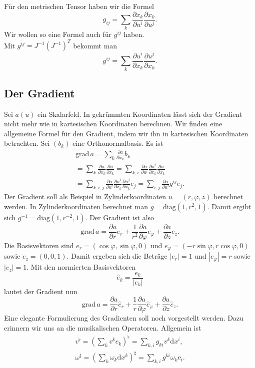 \documentclass[a4paper,10pt,fleqn,twocolumn,twoside]{article}
\begin{document}
Für den metrischen Tensor haben wir die Formel
\[g_{ij} = \sum_{k} \frac{\partial x_k}{\partial u^i}
\frac{\partial x_k}{\partial u^j}.\]
Wir wollen so eine Formel auch für \(g^{ij}\) haben.\\
Mit \(g^{ij}=J^{-1}(J^{-1})^T\) bekommt man
\[g^{ij} = \sum_{k} \frac{\partial u^i}{\partial x_k}
\frac{\partial u^j}{\partial x_k}.\]

\subsection{Der Gradient}

Sei \(a(u)\) ein Skalarfeld. In gekrümmten Koordinaten lässt sich
der Gradient nicht mehr wie in kartesischen Koordinaten berechnen.
Wir finden eine allgemeine Formel für den Gradient, indem wir ihn in
kartesischen Koordinaten betrachten. Sei \((b_k)\) eine
Orthonormalbasis. Es ist
\begin{gather*}\mathrm{grad}\,a
= \sum_{k}\frac{\partial a}{\partial x_k}b_k\\
= \sum_{k}\frac{\partial a}{\partial x_k}\frac{\partial u}{\partial x_k}
= \sum_{k,i}\frac{\partial a}{\partial u^i}\frac{\partial u^i}{\partial x_k}
\frac{\partial u}{\partial x_k}\\
= \sum_{k,i,j}\frac{\partial a}{\partial u^i}\frac{\partial u^i}{\partial x_k}
\frac{\partial u^j}{\partial x_k}e_j
= \sum_{i,j}\frac{\partial a}{\partial u^i} g^{ij}e_j.
\end{gather*}
%
Der Gradient soll als Beispiel in Zylinderkoordinaten
\(u=(r,\varphi,z)\) berechnet werden. In Zylinderkoordinaten
berechnet man \(g = \mathrm{diag}(1,r^2,1)\). Damit ergibt sich
\(g^{-1} = \mathrm{diag}(1,r^{-2},1)\). Der Gradient ist also
\[\mathrm{grad}\,a = \frac{\partial a}{\partial r} e_r
+\frac{1}{r^2}\frac{\partial a}{\partial \varphi} e_\varphi
+\frac{\partial a}{\partial z} e_z.\]
Die Basisvektoren sind \(e_r=(\cos\varphi,\sin\varphi,0)\)
und \(e_\varphi = (-r\sin\varphi,r\cos\varphi,0)\)
sowie \(e_z=(0,0,1)\). Damit ergeben sich die Beträge \(|e_r|=1\)
und \(|e_\varphi|=r\) sowie \(|e_z|=1\). Mit den normierten
Basisvektoren
\[\hat e_k = \frac{e_k}{|e_k|}\]
lautet der Gradient nun
\[\mathrm{grad}\,a = \frac{\partial a}{\partial r} \hat e_r
+\frac{1}{r}\frac{\partial a}{\partial \varphi}\hat e_\varphi
+\frac{\partial a}{\partial z} \hat e_z.\]
%
Eine elegante Formulierung des Gradienten soll noch vorgestellt
werden. Dazu erinnern wir uns an die musikalischen Operatoren.
Allgemein ist
\begin{gather*}
v^\flat = (\sum_k v^k e_k)^\flat
= \sum_{k,i} g_{ki}v^k\mathrm dx^i,\\
\omega^\sharp = (\sum_k \omega_k\mathrm dx^k)^\sharp
= \sum_{k,i} g^{ki}\omega_k\mathrm e_i.
\end{gather*}
\end{document}
